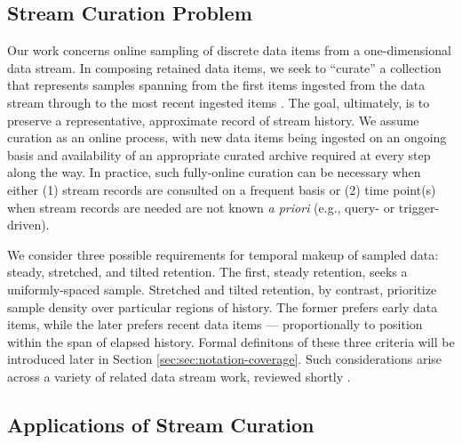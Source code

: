\subsection{Stream Curation Problem}

Our work concerns online sampling of discrete data items from a one-dimensional data stream.
In composing retained data items, we seek to ``curate'' a collection that represents samples spanning from the first items ingested from the data stream through to the most recent ingested items \citep{moreno2024algorithms}.
The goal, ultimately, is to preserve a representative, approximate record of stream history.
We assume curation as an online process, with new data items being ingested on an ongoing basis and availability of an appropriate curated archive required at every step along the way.
In practice, such fully-online curation can be necessary when either (1) stream records are consulted on a frequent basis or (2) time point(s) when stream records are needed are not known \textit{a priori} (e.g., query- or trigger-driven).

We consider three possible requirements for temporal makeup of sampled data: steady, stretched, and tilted retention.
The first, steady retention, seeks a uniformly-spaced sample.
Stretched and tilted retention, by contrast, prioritize sample density over particular regions of history.
The former prefers early data items, while the later prefers recent data items --- proportionally to position within the span of elapsed history.
Formal definitons of these three criteria will be introduced later in Section \ref{sec:sec:notation-coverage}.
Such considerations arise across a variety of related data stream work, reviewed shortly \citep{aggarwal2003framework,han2005stream}.


\subsection{Applications of Stream Curation}

